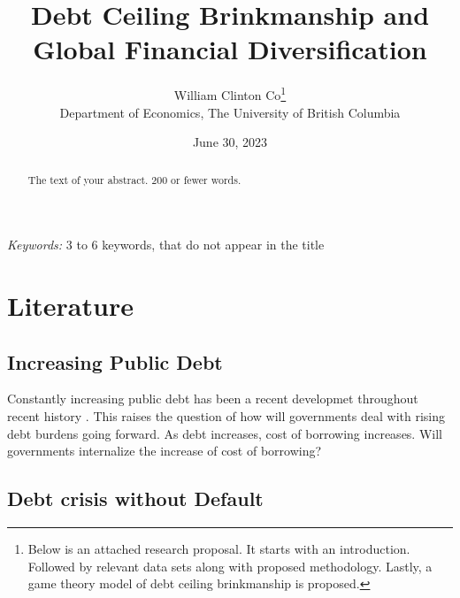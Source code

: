 \documentclass[
  12pt]{article}
\begin{document}
\def\spacingset#1{\renewcommand{\baselinestretch}%
{#1}\small\normalsize} \spacingset{1}



\date{June 30, 2023}
\title{\bf Debt Ceiling Brinkmanship and Global Financial
Diversification}
\author{
William Clinton Co\thanks{Below is an attached research proposal. It
starts with an introduction. Followed by relevant data sets along with
proposed methodology. Lastly, a game theory model of debt ceiling
brinkmanship is proposed.}\\
Department of Economics, The University of British Columbia\\
}
\maketitle

\bigskip
\bigskip
\begin{abstract}
The text of your abstract. 200 or fewer words.
\end{abstract}

\noindent%
{\it Keywords:} 3 to 6 keywords, that do not appear in the title
\vfill

\newpage
\spacingset{1.9} %
\ifdefined\Shaded\renewenvironment{Shaded}{\begin{tcolorbox}[frame hidden, boxrule=0pt, breakable, enhanced, sharp corners, borderline west={3pt}{0pt}{shadecolor}, interior hidden]}{\end{tcolorbox}}\fi

\hypertarget{sec-l}{%
\section{Literature}\label{sec-l}}

\hypertarget{increasing-public-debt}{%
\subsection{Increasing Public Debt}\label{increasing-public-debt}}

Constantly increasing public debt has been a recent developmet
throughout recent history \citet{mitchener2023}. This raises the
question of how will governments deal with rising debt burdens going
forward. As debt increases, cost of borrowing increases. Will
governments internalize the increase of cost of borrowing?

\hypertarget{debt-crisis-without-default}{%
\subsection{Debt crisis without
Default}\label{debt-crisis-without-default}}
\end{document}
